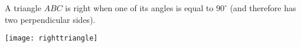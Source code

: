 \documentclass{article}
\begin{document}
A triangle $ABC$ is right when one of its angles is equal to $90^\circ$ (and therefore has two perpendicular sides).

\begin{center}
\texttt{[image: righttriangle]}
\end{center}
\end{document}
